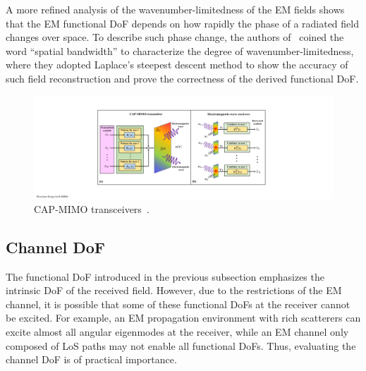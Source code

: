 \documentclass[journal,twocolumn]{IEEEtran}
\begin{document}
A more refined analysis of the wavenumber-limitedness of the EM fields shows that the EM functional DoF depends on how rapidly the phase of a radiated field changes over space. 
To describe such phase change, the authors of~\cite{bucci1987spatial} coined the word ``spatial bandwidth'' to characterize the degree of wavenumber-limitedness, where they adopted Laplace's steepest descent method to show the accuracy of such field reconstruction and prove the correctness of the derived functional DoF. 

\begin{figure}[ht]
	\centering 
	\includegraphics[width=0.81\linewidth]{figures/CAPMIMO.pdf} 
	\caption{CAP-MIMO transceivers~\cite{zhang2022pdma}.  }
	\label{fig:CAPMIMO}
\end{figure}

\vspace{-2em}
\subsection{Channel DoF}
The functional DoF introduced in the previous subsection emphasizes the intrinsic DoF of the received field. 
However, due to the restrictions of the EM channel, it is possible that some of these functional DoFs at the receiver cannot be excited. For example, an EM propagation environment with rich  scatterers can excite almost all angular eigenmodes at the receiver, while an EM channel only composed of LoS paths may not enable all functional DoFs. Thus, evaluating the channel DoF is of practical importance.  
\end{document}
